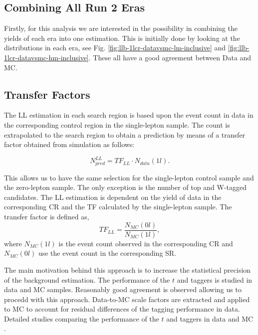 \subsection{Combining All Run 2 Eras}\label{sec:LLCombination}
Firstly, for this analysis we are interested in the possibility in combining the yields of each era into one estimation. This is initially done by looking at the \met{} distributions in each era, see Fig. \ref{fig:llb-1lcr-datavsmc-lm-inclusive} and \ref{fig:llb-1lcr-datavsmc-hm-inclusive}. These all have a good agreement between Data and MC. 


\subsection{Transfer Factors}
\label{subsec:TF}

The LL estimation in each search region is based upon the event count in data in the corresponding control region in the single-lepton sample. The count is extrapolated to the search region to obtain a prediction by means of a transfer factor obtained from simulation as follows: 

\begin{equation}
\label{eqn:LLTF}
N_{pred}^{LL}=TF_{LL} \cdot N_{data}(1l).
\end{equation}

This allows us to have the same selection for the single-lepton control sample and the zero-lepton sample. The only exception is the number of top and W-tagged candidates. The LL estimation is dependent on the yield of data in the corresponding CR and the TF calculated by the single-lepton sample. The transfer factor is defined as, 
\begin{equation}
\label{eqn:TF}
TF_{LL}=\frac{N_{MC}(0l)}{N_{MC}(1l)},
\end{equation}
where $N_{MC}(1l)$ is the event count observed in the corresponding CR and $N_{MC}(0l)$ use the event count in the corresponding SR. 

The main motivation behind this approach is to increase the statistical precision of the background estimation. The performance of the $t$ and \W{} taggers is studied in data and MC samples. Reasonably good agreement is observed allowing us to procedd with this approach. Data-to-MC scale factors are extracted and applied to MC to account for residual differences of the tagging performance in data. Detailed studies comparing the performance of the $t$ and \W{} taggers in data and MC \cite{noauthor_search_nodate}.

